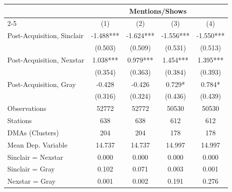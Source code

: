 {
\def\sym#1{\ifmmode^{#1}\else\(^{#1}\)\fi}
\begin{tabular}{l*{4}{c}}
\toprule
                &\multicolumn{4}{c}{Mentions/Shows}                 \\\cmidrule(lr){2-5}
                &\multicolumn{1}{c}{(1)}   &\multicolumn{1}{c}{(2)}   &\multicolumn{1}{c}{(3)}   &\multicolumn{1}{c}{(4)}   \\
\midrule
Post-Acquisition, Sinclair&   -1.488***&   -1.624***&   -1.556***&   -1.550***\\
                &  (0.503)   &  (0.509)   &  (0.531)   &  (0.513)   \\
Post-Acquisition, Nexstar&    1.038***&    0.979***&    1.454***&    1.395***\\
                &  (0.354)   &  (0.363)   &  (0.384)   &  (0.393)   \\
Post-Acquisition, Gray&   -0.428   &   -0.426   &    0.729*  &    0.784*  \\
                &  (0.316)   &  (0.324)   &  (0.436)   &  (0.439)   \\
\midrule
Observations    &    52772   &    52772   &    50530   &    50530   \\
Stations        &      638   &      638   &      612   &      612   \\
DMAs (Clusters) &      204   &      204   &      178   &      178   \\
Mean Dep. Variable&   14.737   &   14.737   &   14.997   &   14.997   \\
\midrule Sinclair = Nexstar&    0.000   &    0.000   &    0.000   &    0.000   \\
Sinclair = Gray &    0.102   &    0.071   &    0.003   &    0.001   \\
Nexstar = Gray  &    0.001   &    0.002   &    0.191   &    0.276   \\
\bottomrule
\end{tabular}
}
